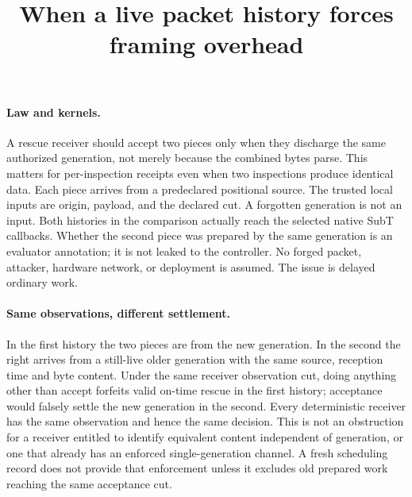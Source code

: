 \documentclass{article}
\title{When a live packet history forces framing overhead}
\author{}\date{}
\begin{document}
\maketitle

\paragraph{Law and kernels.}
A rescue receiver should accept two pieces only when they discharge the
same authorized generation, not merely because the combined bytes parse.
This matters for per-inspection receipts even when two inspections produce
identical data. Each piece arrives from a predeclared positional source.
The trusted local inputs are origin, payload, and the declared cut. A
forgotten generation is not an input. Both histories in the comparison
actually reach the selected native SubT callbacks. Whether the second piece
was prepared by the same generation is an evaluator annotation; it is
not leaked to the controller. No forged packet, attacker, hardware
network, or deployment is assumed. The issue is delayed ordinary work.

\paragraph{Same observations, different settlement.}
In the first history the two pieces are from the new generation. In the
second the right arrives from a still-live older generation with the same
source, reception time and byte content. Under the same receiver observation
cut, doing anything other than accept forfeits valid on-time rescue in the
first history; acceptance would falsely settle the new generation in the
second. Every deterministic receiver has the same observation and hence the
same decision. This is not an obstruction for a receiver entitled to
identify equivalent content independent of generation, or one that already
has an enforced single-generation channel. A fresh scheduling record does
not provide that enforcement unless it excludes old prepared work reaching
the same acceptance cut.
\end{document}
